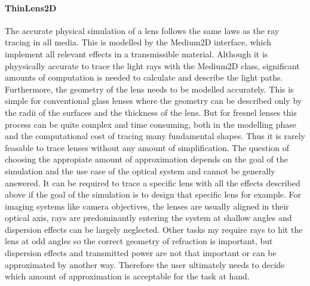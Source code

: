 \documentclass[a4paper,10pt]{article}
\begin{document}
    \paragraph{ThinLens2D}

    The accurate physical simulation of a lens follows the same laws
    as the ray tracing in all media.
    This is modelled by the Medium2D interface, which implement all
    relevant effects in a transmissible material.
    Although it is phyysically accurate to trace the light rays with
    the Medium2D class, significant amounts of computation is needed
    to calculate and describe the light paths.
    Furthermore, the geometry of the lens needs to be modelled accurately.
    This is simple for conventional glass lenses where the geometry can be
    described only by the radii of the surfaces and the thickness of the lens.
    But for fresnel lenses this process can be quite complex and time
    consuming, both in the modelling phase and the computational cost
    of tracing many fundamental shapes.
    Thus it is rarely feasable to trace lenses without any amount
    of simplification.
    The question of choosing the appropiate amount of approximation depends on the goal of the
    simulation and the use case of the optical system and cannot be
    generally answered.
    It can be required to trace a specific lens with all the effects described
    above if the goal of the simulation is to design that specific lens
    for example.
    For imaging systems like camera objectives, the lenses are usually
    aligned in their optical axis, rays are predominantly 
    entering the system at shallow angles and dispersion effects can 
    be largely neglected.
    Other tasks my require rays to hit the lens at odd angles so the
    correct geometry of refraction is important, but dispersion effects
    and transmitted power are not that important or can be 
    approximated by another way.
    Therefore the user ultimately needs to decide which amount of 
    approximation is acceptable for the task at hand.        
\end{document}
